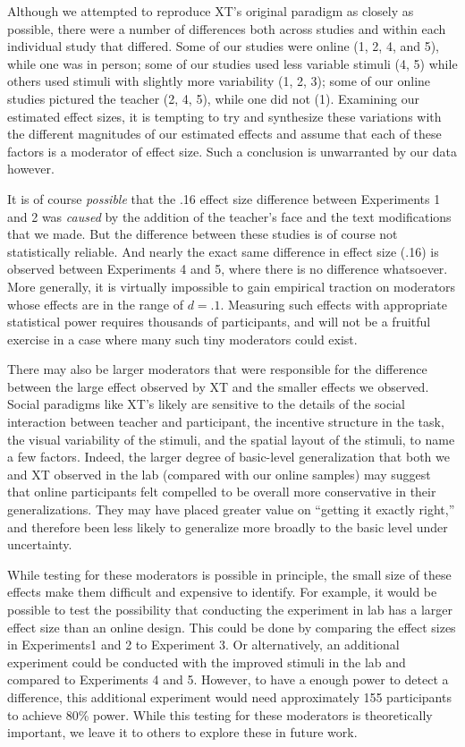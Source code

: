 \documentclass[man]{apa2}
\begin{document}
Although we attempted to reproduce XT's original paradigm as closely as possible, there were a number of differences both across studies and within each individual study that differed. Some of our studies were online (1, 2, 4, and 5), while one was in person; some of our studies used less variable stimuli (4, 5) while others used stimuli with slightly more variability (1, 2, 3); some of our online studies pictured the teacher (2, 4, 5), while one did not (1). Examining our estimated effect sizes, it is tempting to try and synthesize these variations with the different magnitudes of our estimated effects and assume that each of these factors is a moderator of effect size. Such a conclusion is unwarranted by our data however. 

It is of course \emph{possible} that the .16 effect size difference between Experiments 1 and 2 was \emph{caused} by the addition of the teacher's face and the text modifications that we made. But the difference between these studies is of course not statistically reliable. And nearly the exact same difference in effect size (.16) is observed between Experiments 4 and 5, where there is no difference whatsoever. More generally, it is virtually impossible to gain empirical traction on moderators whose effects are in the range of $d = .1$. Measuring such effects with appropriate statistical power requires thousands of participants, and will not be a fruitful exercise in a case where many such tiny moderators could exist. 

There may also be larger moderators that were responsible for the difference between the large effect observed by XT and the smaller effects we observed. Social paradigms like XT's likely are sensitive to the details of the social interaction between teacher and participant, the incentive structure in the task, the visual variability of the stimuli, and the spatial layout of the stimuli, to name a few factors. Indeed, the larger degree of basic-level generalization that both we and XT observed in the lab (compared with our online samples) may suggest that online participants felt compelled to be overall more conservative in their generalizations. They may have placed greater value on ``getting it exactly right,'' and therefore been less likely to generalize more broadly to the basic level under uncertainty. 

While testing for these moderators is possible in principle, the small size of these effects make them difficult and expensive to identify. For example, it would be possible to  test the possibility that conducting the experiment in lab has a larger effect size than an online design. This could be done by comparing the effect sizes in Experiments1 and 2 to Experiment 3. Or alternatively, an additional experiment could be conducted with the improved stimuli in the lab and compared to Experiments 4 and 5. However, to have a enough power to detect a difference, this additional experiment would need approximately 155 participants to achieve 80\% power. While this testing for these moderators is theoretically important, we leave it to others to explore these in future work.
\end{document}
